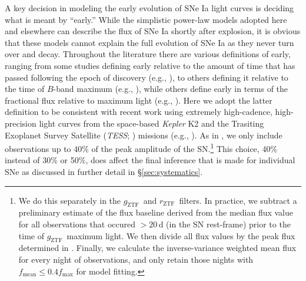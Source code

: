 \documentclass[twocolumn]{aastex63}
\newcommand{\rztf}{$r_\mathrm{ZTF}$}
\newcommand{\gztf}{$g_\mathrm{ZTF}$}
\begin{document}
A key decision in modeling the early evolution of SNe Ia light curves is
deciding what is meant by ``early.'' While the simplistic power-law models
adopted here and elsewhere can describe the flux of SNe Ia shortly after
explosion, it is obvious that these models cannot explain the full evolution
of SNe Ia as they never turn over and decay. Throughout the literature there
are various definitions of early, ranging from some studies defining early
relative to the amount of time that has passed following the epoch of
discovery (e.g., \citealt{Zheng13,Miller18}), to others defining it relative
to the time of $B$-band maximum (e.g., \citealt{Riess99a,Conley06}), while
others define early in terms of the fractional flux relative to maximum light
(e.g., \citealt{Olling15,Firth15,Fausnaugh19}). Here we adopt the latter
definition to be consistent with recent work using extremely high-cadence,
high-precision light curves from the space-based \textit{Kepler} K2
\citep{Howell14} and the Trasiting Exoplanet Survey Satellite (\textit{TESS};
\citealt{Ricker15}) missions (e.g., \citealt{Olling15,Fausnaugh19}). As in
\citet{Olling15}, we only include observations up to 40\% of the peak
amplitude of the SN.\footnote{We do this separately in the \gztf\ and \rztf\
filters. In practice, we subtract a preliminary estimate of the flux baseline
derived from the median flux value for all observations that occured $>20$\,d
(in the SN rest-frame) prior to the time of \gztf\ maximum light. We then
divide all flux values by the peak flux determined in \citet{Yao19}. Finally,
we calculate the inverse-variance weighted mean flux for every night of
observations, and only retain those nights with $f_\mathrm{mean} \le 0.4
f_\mathrm{max}$ for model fitting.} This choice, 40\% instead of 30\% or
50\%, does affect the final inference that is made for individual SNe as
discussed in further detail in \S\ref{sec:systematics}.
\end{document}
